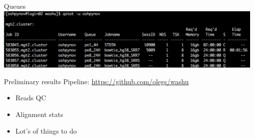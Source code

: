 \documentclass{beamer}
\begin{document}
\begin{frame}{Queues}
\includegraphics[width=\linewidth]{queue.png}\\
\end{frame}


\begin{frame}{Preliminary results}
Pipeline: \url{https://github.com/olegs/washu}
\begin{itemize}
\item Reads QC
\item Alignment stats
\item Lot's of things to do
\end{itemize}
\end{frame}


\begin{frame}
\\
\end{frame}
\end{document}
